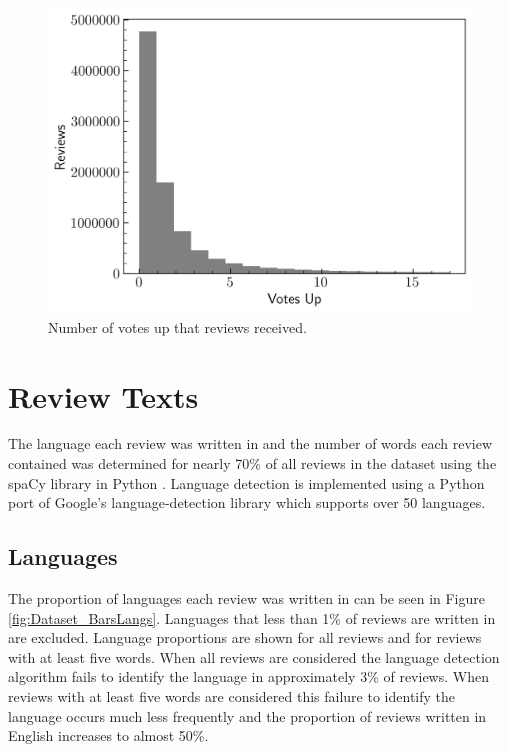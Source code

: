 \begin{figure}[ht]
    \centering
    \includegraphics[scale=0.55]{figures/03_dataset/11_hist_review_votes.png}
    \caption{Number of votes up that reviews received.}
    \label{fig:Dataset_HistVotes}
\end{figure}

\section{Review Texts} \label{sec:Dataset_ReviewTexts}

The language each review was written in and the number of words each review contained was determined for nearly 70\% of all reviews in the dataset using the spaCy library in Python \cite{spacy}. Language detection is implemented using a Python port \cite{PyPi_LangDetect} of Google's language-detection library \cite{Nakatani2010_LangDetect} which supports over 50 languages.

\subsection{Languages}

The proportion of languages each review was written in can be seen in Figure \ref{fig:Dataset_BarsLangs}. Languages that less than 1\% of reviews are written in are excluded. Language proportions are shown for all reviews and for reviews with at least five words. When all reviews are considered the language detection algorithm fails to identify the language in approximately 3\% of reviews. When reviews with at least five words are considered this failure to identify the language occurs much less frequently and the proportion of reviews written in English increases to almost 50\%.

